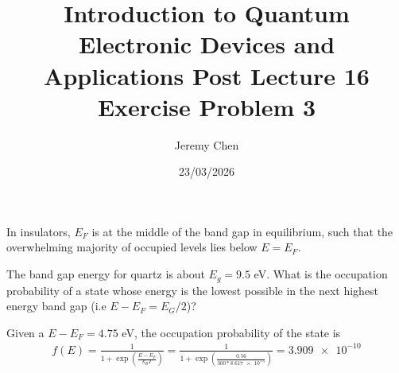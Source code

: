 \documentclass[10pt,letterpaper]{article}
\title{Introduction to Quantum Electronic Devices and Applications Post Lecture 16 Exercise Problem 3}
\date{23/03/2026}
\author{Jeremy Chen}
\begin{document}
	\maketitle
	
	\noindent In insulators, $E_{F}$ is at the middle of the band gap in equilibrium, such that the overwhelming majority of occupied levels lies below $E = E_{F}$.
	
	\noindent The band gap energy for quartz is about $E_{g} = 9.5$ eV. What is the occupation probability of a state whose energy is the lowest possible in the next highest energy band gap (i.e $E - E_{F} = E_{G}/2$)? 
	
	\color{violet}
	Given a $E - E_{F} = 4.75$ eV, the occupation probability of the state is
	\begin{gather*}
		f(E) = \frac{1}{1 + \exp{\left( \frac{E - E_{F}}{k_{B}T} \right)}} = \frac{1}{1 + \exp{\left( \frac{0.56}{300 * \num{8.617e-5}} \right)}} = \num{3.909e-10}
	\end{gather*}
	\color{black}
	
\end{document}
